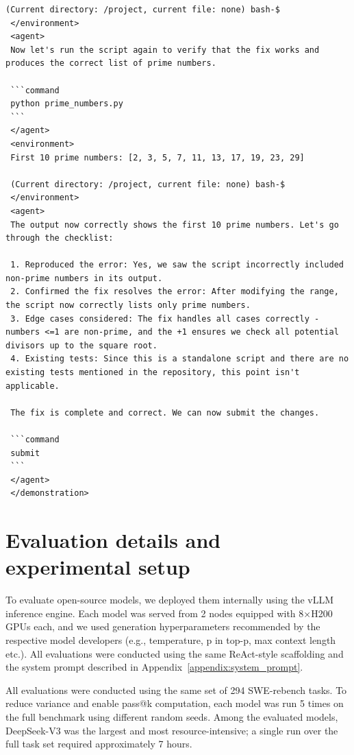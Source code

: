 \documentclass[dandb]{article}
\begin{document}
\begin{lstlisting}[upquote=true,caption=System prompt for LLM evaluation runs on SWE-rebench leaderboard tasks]
 (Current directory: /project, current file: none) bash-$
 </environment>
 <agent>
 Now let's run the script again to verify that the fix works and produces the correct list of prime numbers.

 ```command
 python prime_numbers.py
 ```
 </agent>
 <environment>
 First 10 prime numbers: [2, 3, 5, 7, 11, 13, 17, 19, 23, 29]

 (Current directory: /project, current file: none) bash-$
 </environment>
 <agent>
 The output now correctly shows the first 10 prime numbers. Let's go through the checklist:

 1. Reproduced the error: Yes, we saw the script incorrectly included non-prime numbers in its output.
 2. Confirmed the fix resolves the error: After modifying the range, the script now correctly lists only prime numbers.
 3. Edge cases considered: The fix handles all cases correctly - numbers <=1 are non-prime, and the +1 ensures we check all potential divisors up to the square root.
 4. Existing tests: Since this is a standalone script and there are no existing tests mentioned in the repository, this point isn't applicable.

 The fix is complete and correct. We can now submit the changes.

 ```command
 submit
 ```
 </agent>
 </demonstration>
\end{lstlisting}

\section{Evaluation details and experimental setup}
\label{appendix:exp_setup}

\lstset{
  basicstyle=\ttfamily,
  breaklines=true,
  frame=single,
  columns=fullflexible,
  upquote=true
}

To evaluate open-source models, we deployed them internally using the vLLM \citep{kwon2023efficient} inference engine. Each model was served from 2 nodes equipped with 8×H200 GPUs each, and we used generation hyperparameters recommended by the respective model developers (e.g., temperature, p in top-p, max context length etc.). All evaluations were conducted using the same ReAct-style scaffolding and the system prompt described in Appendix~\ref{appendix:system_prompt}.

All evaluations were conducted using the same set of 294 SWE-rebench tasks. To reduce variance and enable pass@k computation, each model was run 5 times on the full benchmark using different random seeds. Among the evaluated models, DeepSeek-V3 was the largest and most resource-intensive; a single run over the full task set required approximately 7 hours.
\end{document}
